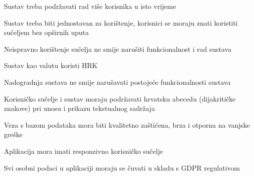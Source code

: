 			\begin{packed_item}
				\item Sustav treba podržavati rad više korisnika u isto vrijeme
				\item Sustav treba biti jednostavan za korištenje, korisnici se moraju znati koristiti sučeljem bez opširnih uputa
				\item Neispravno korištenje sučelja ne smije narušiti funkcionalnost i rad sustava
				\item Sustav kao valutu koristi HRK
				\item Nadogradnja sustava ne smije narušavati postojeće funkcionalnosti sustava
				\item Korisničko sučelje i sustav moraju podržavati hrvatsku abecedu (dijakritičke znakove) pri unosu i prikazu tekstualnog sadržaja
				\item Veza s bazom podataka mora biti kvalitetno zaštićena, brza i otporna na vanjske greške
				\item Aplikacija mora imati responzivno korisničko sučelje
				\item Svi osobni podaci u aplikaciji moraju se čuvati u skladu s GDPR regulativom
			\end{packed_item}
			 
			 
			 
	